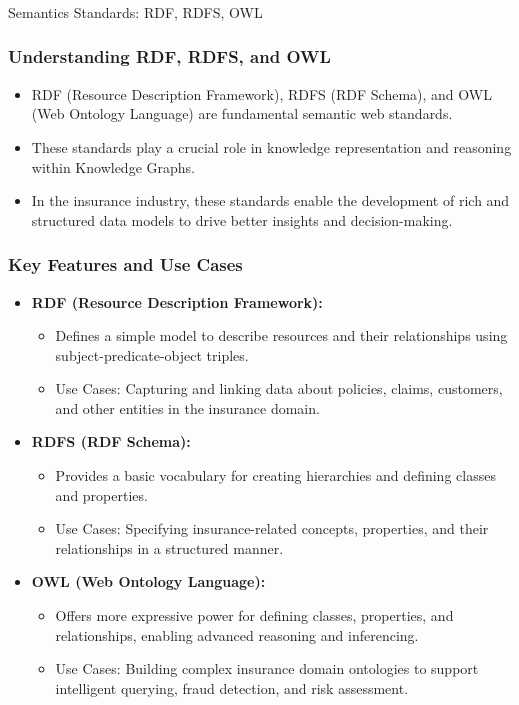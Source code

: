 \begin{frame}[fragile]\frametitle{}
\begin{center}
{\Large Semantics Standards: RDF, RDFS, OWL }
\end{center}
\end{frame}

\begin{frame}[fragile]
\frametitle{Understanding RDF, RDFS, and OWL}
\begin{itemize}
\item RDF (Resource Description Framework), RDFS (RDF Schema), and OWL (Web Ontology Language) are fundamental semantic web standards.
\item These standards play a crucial role in knowledge representation and reasoning within Knowledge Graphs.
\item In the insurance industry, these standards enable the development of rich and structured data models to drive better insights and decision-making.
\end{itemize}
\end{frame}

\begin{frame}[fragile]
\frametitle{Key Features and Use Cases}
\begin{itemize}
\item \textbf{RDF (Resource Description Framework):}
\begin{itemize}
\item Defines a simple model to describe resources and their relationships using subject-predicate-object triples.
\item Use Cases: Capturing and linking data about policies, claims, customers, and other entities in the insurance domain.
\end{itemize}

\item \textbf{RDFS (RDF Schema):}
\begin{itemize}
\item Provides a basic vocabulary for creating hierarchies and defining classes and properties.
\item Use Cases: Specifying insurance-related concepts, properties, and their relationships in a structured manner.
\end{itemize}

\item \textbf{OWL (Web Ontology Language):}
\begin{itemize}
\item Offers more expressive power for defining classes, properties, and relationships, enabling advanced reasoning and inferencing.
\item Use Cases: Building complex insurance domain ontologies to support intelligent querying, fraud detection, and risk assessment.
\end{itemize}
\end{itemize}
\end{frame}


